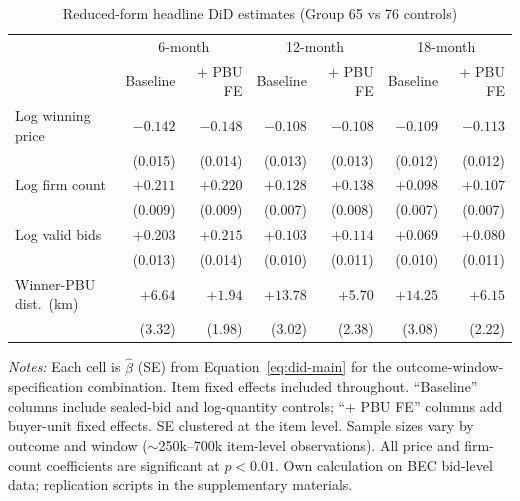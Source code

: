\documentclass[12pt]{article}
\begin{document}
\begin{table}[htbp]
\centering
\caption{Reduced-form headline DiD estimates (Group 65 vs 76 controls)}
\label{tab:rf-headline}
\begin{threeparttable}
\footnotesize
\setlength{\tabcolsep}{4pt}
\begin{tabular}{lrrrrrr}
\toprule
                  & \multicolumn{2}{c}{6-month} & \multicolumn{2}{c}{12-month} & \multicolumn{2}{c}{18-month} \\
                  & Baseline & + PBU FE & Baseline & + PBU FE & Baseline & + PBU FE \\
\midrule
Log winning price & $-0.142$ & $-0.148$ & $-0.108$ & $-0.108$ & $-0.109$ & $-0.113$ \\
                  & (0.015)  & (0.014)  & (0.013)  & (0.013)  & (0.012)  & (0.012)  \\
Log firm count    & $+0.211$ & $+0.220$ & $+0.128$ & $+0.138$ & $+0.098$ & $+0.107$ \\
                  & (0.009)  & (0.009)  & (0.007)  & (0.008)  & (0.007)  & (0.007)  \\
Log valid bids    & $+0.203$ & $+0.215$ & $+0.103$ & $+0.114$ & $+0.069$ & $+0.080$ \\
                  & (0.013)  & (0.014)  & (0.010)  & (0.011)  & (0.010)  & (0.011)  \\
Winner-PBU dist.\ (km) & $+6.64$ & $+1.94$ & $+13.78$ & $+5.70$ & $+14.25$ & $+6.15$ \\
                  & (3.32)  & (1.98)  & (3.02)  & (2.38)  & (3.08)  & (2.22)  \\
\bottomrule
\end{tabular}
\begin{tablenotes}
\footnotesize
\item \textit{Notes:} Each cell is $\hat\beta$ (SE) from
Equation~\eqref{eq:did-main} for the outcome-window-specification
combination. Item fixed effects included throughout. ``Baseline''
columns include sealed-bid and log-quantity controls; ``+ PBU FE''
columns add buyer-unit fixed effects. SE clustered at the item
level. Sample sizes vary by outcome and window
($\sim$250k--700k item-level observations). All price and
firm-count coefficients are significant at $p < 0.01$. Own
calculation on BEC bid-level data; replication scripts in the
supplementary materials.
\end{tablenotes}
\end{threeparttable}
\end{table}
\end{document}
